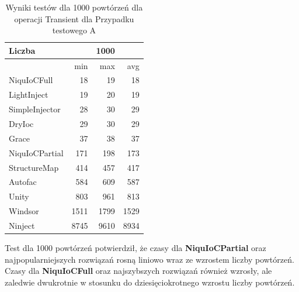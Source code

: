 \documentclass[12pt]{article}
\begin{document}
\begin{table}[H]
\captionsetup{belowskip=0pt,aboveskip=0pt}
\begin{center}
\begin{small}
	\begin{tabular}{ | l | r r r | }
    		\hline
Liczba & & 1000 & \\ \hline
 & min & max & avg \\ \hline
NiquIoCFull & 18 & 19 & 18 \\ \hline
LightInject & 19 & 20 & 19 \\ \hline
SimpleInjector & 28 & 30 & 29 \\ \hline
DryIoc & 29 & 30 & 29 \\ \hline
Grace & 37 & 38 & 37 \\ \hline
NiquIoCPartial & 171 & 198 & 173 \\ \hline
StructureMap & 414 & 457 & 417 \\ \hline
Autofac & 584 & 609 & 587 \\ \hline
Unity & 803 & 961 & 813 \\ \hline
Windsor & 1511 & 1799 & 1529 \\ \hline
Ninject & 8745 & 9610 & 8934 \\ \hline
  	\end{tabular}
\end{small}
\end{center}
\caption{Wyniki testów dla 1000 powtórzeń dla operacji Transient dla Przypadku testowego A}
\label{TestCaseA_Transient1000}
\end{table}
Test dla 1000 powtórzeń potwierdził, że czasy dla \textbf{NiquIoCPartial} oraz najpopularniejszych rozwiązań rosną liniowo wraz ze wzrostem liczby powtórzeń. Czasy dla \textbf{NiquIoCFull} oraz najszybszych rozwiązań również wzrosły, ale zaledwie dwukrotnie w stosunku do dziesięciokrotnego wzrostu liczby powtórzeń.
\end{document}
